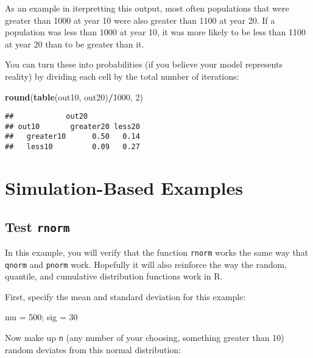 \documentclass[]{book}
\newenvironment{Shaded}{\begin{snugshade}}{\end{snugshade}}
\newcommand{\KeywordTok}[1]{\textcolor[rgb]{0.13,0.29,0.53}{\textbf{#1}}}
\newcommand{\DecValTok}[1]{\textcolor[rgb]{0.00,0.00,0.81}{#1}}
\newcommand{\StringTok}[1]{\textcolor[rgb]{0.31,0.60,0.02}{#1}}
\newcommand{\OperatorTok}[1]{\textcolor[rgb]{0.81,0.36,0.00}{\textbf{#1}}}
\newcommand{\NormalTok}[1]{#1}
\theoremstyle{definition}
\theoremstyle{definition}
\theoremstyle{definition}
\theoremstyle{remark}
\begin{document}
As an example in iterpretting this output, most often populations that
were greater than 1000 at year 10 were also greater than 1100 at year
20. If a population was less than 1000 at year 10, it was more likely to
be less than 1100 at year 20 than to be greater than it.

You can turn these into probabilities (if you believe your model
represents reality) by dividing each cell by the total number of
iterations:

\begin{Shaded}
\begin{Highlighting}[]
\KeywordTok{round}\NormalTok{(}\KeywordTok{table}\NormalTok{(out10, out20)}\OperatorTok{/}\DecValTok{1000}\NormalTok{, }\DecValTok{2}\NormalTok{)}
\end{Highlighting}
\end{Shaded}

\begin{verbatim}
##            out20
## out10       greater20 less20
##   greater10      0.50   0.14
##   less10         0.09   0.27
\end{verbatim}

\section{Simulation-Based Examples}\label{sim-examples}

\subsection{\texorpdfstring{Test
\texttt{rnorm}}{Test rnorm}}\label{rnorm-ex}

In this example, you will verify that the function \texttt{rnorm} works
the same way that \texttt{qnorm} and \texttt{pnorm} work. Hopefully it
will also reinforce the way the random, quantile, and cumulative
distribution functions work in R.

First, specify the mean and standard deviation for this example:

\begin{Shaded}
\begin{Highlighting}[]
\NormalTok{mu =}\StringTok{ }\DecValTok{500}\NormalTok{; sig =}\StringTok{ }\DecValTok{30}
\end{Highlighting}
\end{Shaded}

Now make up \texttt{n} (any number of your choosing, something greater
than 10) random deviates from this normal distribution:
\end{document}
